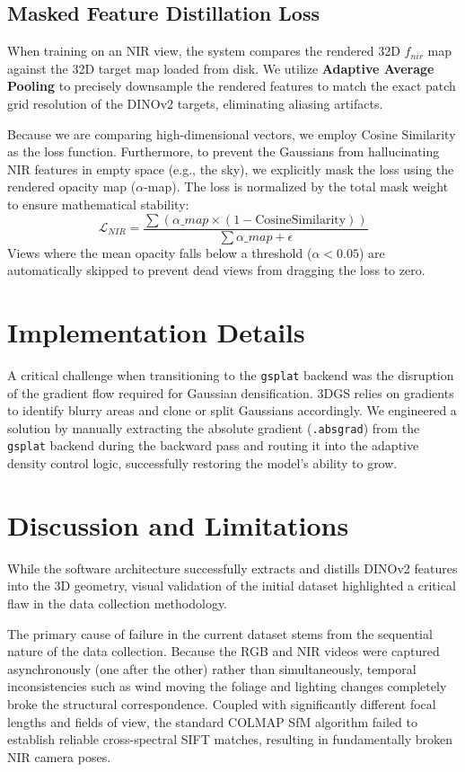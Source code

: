 \documentclass[12pt]{article}
\begin{document}
\subsection{Masked Feature Distillation Loss}
When training on an NIR view, the system compares the rendered 32D $f_{nir}$ map against the 32D target map loaded from disk. We utilize \textbf{Adaptive Average Pooling} to precisely downsample the rendered features to match the exact patch grid resolution of the DINOv2 targets, eliminating aliasing artifacts.

Because we are comparing high-dimensional vectors, we employ Cosine Similarity as the loss function. Furthermore, to prevent the Gaussians from hallucinating NIR features in empty space (e.g., the sky), we explicitly mask the loss using the rendered opacity map ($\alpha$-map). The loss is normalized by the total mask weight to ensure mathematical stability:
\begin{equation}
\mathcal{L}_{NIR} = \frac{\sum (\alpha\_map \times (1 - \text{CosineSimilarity}))}{\sum \alpha\_map + \epsilon}
\end{equation}
Views where the mean opacity falls below a threshold ($\alpha < 0.05$) are automatically skipped to prevent dead views from dragging the loss to zero.

\section{Implementation Details}
A critical challenge when transitioning to the \texttt{gsplat} backend was the disruption of the gradient flow required for Gaussian densification. 3DGS relies on gradients to identify blurry areas and clone or split Gaussians accordingly. We engineered a solution by manually extracting the absolute gradient (\texttt{.absgrad}) from the \texttt{gsplat} backend during the backward pass and routing it into the adaptive density control logic, successfully restoring the model's ability to grow.

\section{Discussion and Limitations}
While the software architecture successfully extracts and distills DINOv2 features into the 3D geometry, visual validation of the initial dataset highlighted a critical flaw in the data collection methodology.

The primary cause of failure in the current dataset stems from the sequential nature of the data collection. Because the RGB and NIR videos were captured asynchronously (one after the other) rather than simultaneously, temporal inconsistencies such as wind moving the foliage and lighting changes completely broke the structural correspondence. Coupled with significantly different focal lengths and fields of view, the standard COLMAP SfM algorithm failed to establish reliable cross-spectral SIFT matches, resulting in fundamentally broken NIR camera poses.
\end{document}
